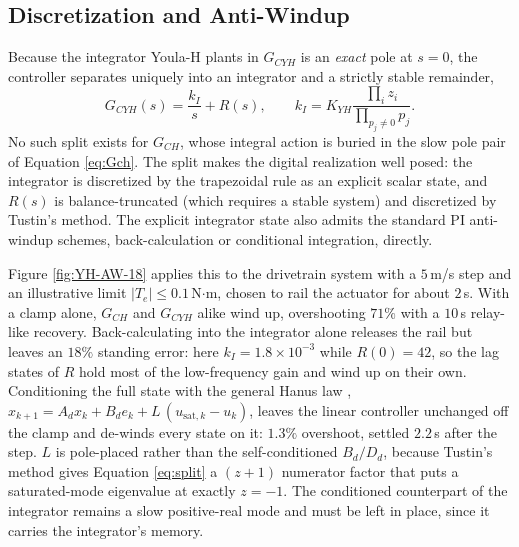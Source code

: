
\subsection{Discretization and Anti-Windup}
\label{sec:antiwindup}
Because the integrator Youla-H plants in $G_{CYH}$ is an \emph{exact} pole at $s=0$, the controller separates uniquely into an integrator and a strictly stable remainder,
\begin{equation} \label{eq:split}
G_{CYH}(s) = \frac{k_I}{s} + R(s), \qquad k_I = K_{YH}\frac{\prod_{i} z_i}{\prod_{p_j\neq 0} p_j}.
\end{equation}
No such split exists for $G_{CH}$, whose integral action is buried in the slow pole pair of Equation \ref{eq:Gch}. The split makes the digital realization well posed: the integrator is discretized by the trapezoidal rule as an explicit scalar state, and $R(s)$ is balance-truncated (which requires a stable system) and discretized by Tustin's method. The explicit integrator state also admits the standard PI anti-windup schemes, back-calculation or conditional integration, directly.

Figure \ref{fig:YH-AW-18} applies this to the drivetrain system with a $5$\,m/s step and an illustrative limit $|T_e|\le 0.1$\,N$\cdot$m, chosen to rail the actuator for about $2$\,s. With a clamp alone, $G_{CH}$ and $G_{CYH}$ alike wind up, overshooting $71\%$ with a $10$\,s relay-like recovery. Back-calculating into the integrator alone releases the rail but leaves an $18\%$ standing error: here $k_I = 1.8\times10^{-3}$ while $R(0) = 42$, so the lag states of $R$ hold most of the low-frequency gain and wind up on their own. Conditioning the full state with the general Hanus law \citep{hanus1987conditioning}, $x_{k+1} = A_d x_k + B_d e_k + L\,(u_{\mathrm{sat},k}-u_k)$, leaves the linear controller unchanged off the clamp and de-winds every state on it: $1.3\%$ overshoot, settled $2.2$\,s after the step. $L$ is pole-placed rather than the self-conditioned $B_d/D_d$, because Tustin's method gives Equation \ref{eq:split} a $(z+1)$ numerator factor that puts a saturated-mode eigenvalue at exactly $z=-1$. The conditioned counterpart of the integrator remains a slow positive-real mode and must be left in place, since it carries the integrator's memory.

